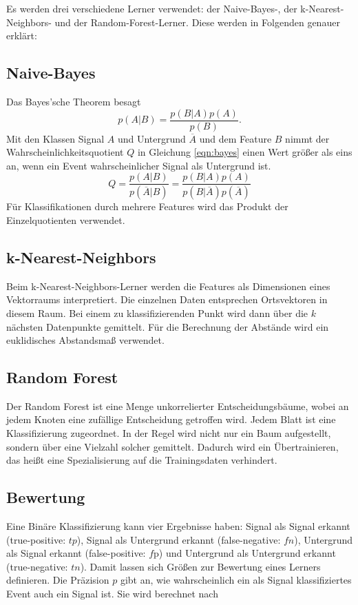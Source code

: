 
Es werden drei verschiedene Lerner verwendet: der Naive-Bayes-, der  k-Nearest-Neighbors- und der Random-Forest-Lerner. Diese werden in Folgenden genauer erklärt:

\subsection{Naive-Bayes}
Das Bayes'sche Theorem besagt
\begin{equation}
	p(A|B)=\frac{p(B|A)p(A)}{p(B)}.
\end{equation}
Mit den Klassen Signal $A$ und Untergrund $\overline{A}$ und dem Feature $B$ nimmt der Wahrscheinlichkeitsquotient $Q$ in Gleichung \eqref{eqn:bayes} einen Wert größer als
eins an, wenn ein Event wahrscheinlicher Signal als Untergrund ist.
\begin{equation}
	Q=\frac{p(A|B)}{p(\overline{A}|B)} = \frac{p(B|A)p(A)}{p(B|\overline{A})p(\overline{A})}
	\label{eqn:bayes}
\end{equation}
Für Klassifikationen durch mehrere Features wird das Produkt der Einzelquotienten verwendet.

\subsection{k-Nearest-Neighbors}
Beim k-Nearest-Neighbors-Lerner  werden die Features als Dimensionen eines Vektorraums interpretiert. Die einzelnen Daten entsprechen Ortsvektoren in diesem Raum. Bei einem zu
klassifizierenden Punkt wird dann über die $k$ nächsten Datenpunkte gemittelt. Für die Berechnung der Abstände wird ein euklidisches Abstandsmaß verwendet.


\subsection{Random Forest}
Der Random Forest ist eine Menge unkorrelierter Entscheidungsbäume, wobei an jedem Knoten eine zufällige Entscheidung getroffen wird. Jedem Blatt ist eine Klassifizierung zugeordnet.
In der Regel wird nicht nur ein Baum aufgestellt, sondern über eine Vielzahl solcher gemittelt. Dadurch wird ein Übertrainieren, das heißt eine Spezialisierung auf die Trainingsdaten verhindert.


\subsection{Bewertung}
Eine Binäre Klassifizierung kann vier Ergebnisse haben: Signal als Signal erkannt (true-positive: $tp$), Signal als Untergrund erkannt (false-negative: $fn$),
Untergrund als Signal erkannt (false-positive: $f$p) und Untergrund als Untergrund erkannt (true-negative: $tn$). Damit lassen sich Größen zur Bewertung eines
Lerners definieren. Die Präzision $p$ gibt an, wie wahrscheinlich ein als Signal klassifiziertes Event auch ein Signal ist. Sie wird berechnet nach

